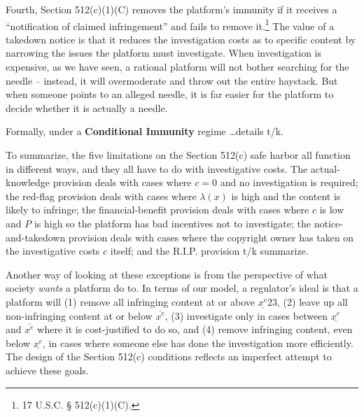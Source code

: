 Fourth, Section 512(c)(1)(C) removes the platform's immunity if it receives a ``notification of claimed infringement'' and fails to remove it.\footnote{17 U.S.C. § 512(c)(1)(C).} The value of a takedown notice is that it reduces the investigation costs as to specific content by narrowing the issues the platform must investigate. When investigation is expensive, as we have seen, a rational platform will not bother searching for the needle -- instead, it will overmoderate and throw out the entire haystack. But when someone points to an alleged needle, it is far easier for the platform to decide whether it is actually a needle.








Formally, under a \textbf{Conditional Immunity} regime \ldots details t/k.

To summarize, the five limitations on the Section 512(c) safe harbor all function in different ways, and they all have to do with investigative costs. The actual-knowledge provision deals with cases where $c = 0$ and no investigation is required; the red-flag provision deals with cases where $\lambda(x)$ is high and the content is likely to infringe; the financial-benefit provision deals with cases where $c$ is low and $P$ is high so the platform has bad incentives not to investigate; the notice-and-takedown provision deals with cases where the copyright owner has taken on the investigative costs $c$ itself; and the R.I.P. provision t/k summarize.

Another way of looking at these exceptions is from the perspective of what society \emph{wants} a platform do to. In terms of our model, a regulator's ideal is that a platform will (1) remove all infringing content at or above $\underline{x^e}23$, (2) leave up all non-infringing content at or below $\overline{x^e}$, (3) investigate only in cases between $\underline{x^e}$ and $\overline{x^e}$ where it is cost-justified to do so, and (4) remove infringing content, even below $\underline{x^e}$, in cases where someone else has done the investigation more efficiently. The design of the Section 512(c) conditions reflects an imperfect attempt to achieve these goals.








